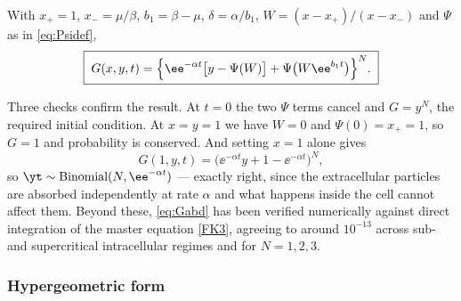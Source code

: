 \begin{proposition}
\label{prop:Gabd}
With $x_+=1$, $x_-=\mu/\beta$, $b_1 = \beta-\mu$, $\delta = \alpha/b_1$,
$W = (x-x_+)/(x-x_-)$ and $\Psi$ as in \cref{eq:Psidef},
\begin{equation}
\label{eq:Gabd}
\boxed{\;
G(x,y,t) = \Bigl\{\ee^{-\alpha t}\bigl[y - \Psi(W)\bigr] + \Psi\bigl(W\ee^{b_1 t}\bigr)\Bigr\}^{N}. \;}
\end{equation}
\end{proposition}

Three checks confirm the result. At $t=0$ the two $\Psi$ terms cancel and
$G = y^N$, the required initial condition. At $x=y=1$ we have $W=0$ and
$\Psi(0)=x_+=1$, so $G=1$ and probability is conserved. And setting $x=1$ alone
gives
\begin{equation*}
G(1,y,t) = \bigl(\ee^{-\alpha t}y + 1 - \ee^{-\alpha t}\bigr)^N,
\end{equation*}
so $\yt\sim\text{Binomial}(N,\ee^{-\alpha t})$ --- exactly right, since the
extracellular particles are absorbed independently at rate $\alpha$ and what happens
inside the cell cannot affect them. Beyond these, \cref{eq:Gabd} has been verified
numerically against direct integration of the master equation \cref{FK3}, agreeing to
around $10^{-13}$ across sub- and supercritical intracellular regimes and for
$N=1,2,3$.

\subsubsection*{Hypergeometric form}

